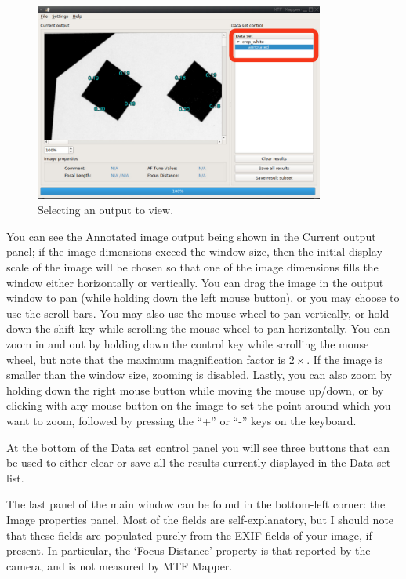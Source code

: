 \documentclass[a4paper]{article}
\begin{document}
\begin{figure}[bt!]
\centering
\includegraphics[width=0.85\textwidth]{figures/open_example2}
\caption{Selecting an output to view.}
\label{fig:open_example2}
\end{figure}

You can see the \textsf{Annotated} image output being shown in
the \textsf{Current output} panel; if the image dimensions exceed the window
size, then the initial display scale of the image
will be chosen so that one of the image dimensions fills the window
either horizontally or vertically.
You can drag the image in the output window to pan (while holding down the
left mouse button), or you may choose to use the scroll bars.
You may also use the mouse wheel to pan vertically, or hold down the shift
key while scrolling the mouse wheel to pan horizontally. You can zoom
in and out by holding down the control key while scrolling the mouse wheel,
but note that the maximum magnification factor is $2\times$. If the image is
smaller than the window size, zooming is disabled. Lastly, you can also zoom by
holding down the right mouse button while moving the mouse up/down, or by
clicking with any mouse button on the image to set the point around which
you want to zoom, followed by pressing the ``+'' or ``-'' keys on the keyboard.


At the bottom of the \textsf{Data set control} panel you will see three
buttons that can be used to either clear or save all the results currently
displayed in the \textsf{Data set} list.

The last panel of the main window can be found in the bottom-left corner:
the \textsf{Image properties} panel. Most of the fields are
self-explanatory, but I should note that these fields are populated purely
from the EXIF fields of your image, if present. In particular, the `Focus
Distance' property is that reported by the camera, and is not measured by
MTF Mapper.
\end{document}
